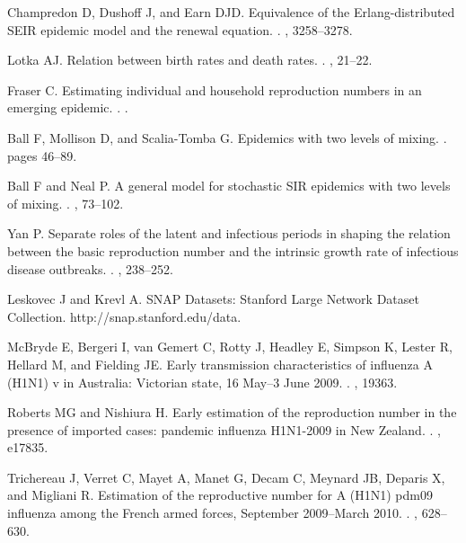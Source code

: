 \documentclass[12pt]{article}
\begin{document}
\begin{thebibliography}{10}
Champredon D, Dushoff J, and Earn DJD.
 {Equivalence of the Erlang-distributed SEIR epidemic model and
  the renewal equation}.
.
, 3258--3278.

Lotka AJ.
 Relation between birth rates and death rates.
.
, 21--22.

Fraser C.
 Estimating individual and household reproduction numbers in an
  emerging epidemic.
.
.

Ball F, Mollison D, and Scalia-Tomba G.
 Epidemics with two levels of mixing.
.
\newblock pages 46--89.

Ball F and Neal P.
 A general model for stochastic {SIR} epidemics with two levels
  of mixing.
.
, 73--102.

Yan P.
 Separate roles of the latent and infectious periods in shaping
  the relation between the basic reproduction number and the intrinsic growth
  rate of infectious disease outbreaks.
.
, 238--252.

Leskovec J and Krevl A.
 {SNAP} {Datasets}: {Stanford Large Network Dataset Collection}.
\newblock http://snap.stanford.edu/data.

McBryde E, Bergeri I, van Gemert C, Rotty J, Headley E, Simpson K, Lester R,
  Hellard M, and Fielding JE.
 {Early transmission characteristics of influenza A (H1N1) v in
  Australia: Victorian state, 16 May--3 June 2009}.
.
, 19363.

Roberts MG and Nishiura H.
 {Early estimation of the reproduction number in the presence of
  imported cases: pandemic influenza H1N1-2009 in New Zealand}.
.
, e17835.

Trichereau J, Verret C, Mayet A, Manet G, Decam C, Meynard JB, Deparis X, and
  Migliani R.
 {Estimation of the reproductive number for A (H1N1) pdm09
  influenza among the French armed forces, September 2009--March 2010}.
.
, 628--630.


\end{thebibliography}
\end{document}
